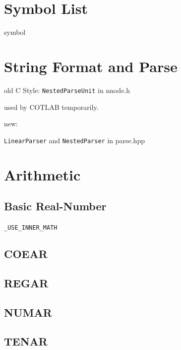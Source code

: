 

\section{Symbol List}

{symbol}



\section{String Format and Parse}

old C Style: \verb|NestedParseUnit| in nnode.h

used by COTLAB temporarily.

new:

\verb|LinearParser| and \verb|NestedParser| in parse.hpp



\section{Arithmetic}



\subsection{Basic Real-Number}

\verb|_USE_INNER_MATH|



\subsection{COEAR}



\subsection{REGAR}



\subsection{NUMAR}



\subsection{TENAR}



